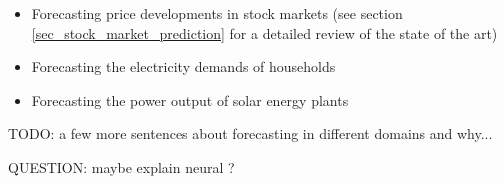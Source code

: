 \begin{itemize}
	\item Forecasting price developments in stock markets (see section \ref{sec_stock_market_prediction} for a detailed review of the state of the art)
	\item Forecasting the electricity demands of households \cite{veit2014household}
	\item Forecasting the power output of solar energy plants \cite{inman2013solar}
\end{itemize}

TODO: a few more sentences about forecasting in different domains and why...

QUESTION: maybe explain neural ?
